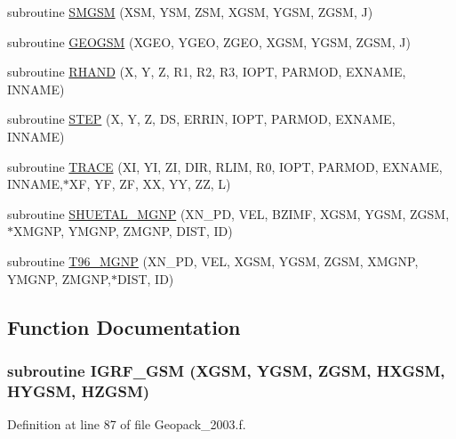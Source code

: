 \begin{CompactItemize}
\item 
subroutine \hyperlink{_geopack__2003_8f_3c1b6bd041138ad15b19a284572c0283}{SMGSM} (XSM, YSM, ZSM, XGSM, YGSM, ZGSM, J)
\item 
subroutine \hyperlink{_geopack__2003_8f_a724192dda005c0ef8d4e8cb9d5465dd}{GEOGSM} (XGEO, YGEO, ZGEO, XGSM, YGSM, ZGSM, J)
\item 
subroutine \hyperlink{_geopack__2003_8f_964ce3d6c1eb16a70ec41d33544e4d07}{RHAND} (X, Y, Z, R1, R2, R3, IOPT, PARMOD, EXNAME, INNAME)
\item 
subroutine \hyperlink{_geopack__2003_8f_4b84b9909d3de37b1cbfd0e8ef98d2af}{STEP} (X, Y, Z, DS, ERRIN, IOPT, PARMOD, EXNAME, INNAME)
\item 
subroutine \hyperlink{_geopack__2003_8f_e88b362d0d3c99ad9c733e9fc088b731}{TRACE} (XI, YI, ZI, DIR, RLIM, R0, IOPT, PARMOD, EXNAME, INNAME,$\ast$XF, YF, ZF, XX, YY, ZZ, L)
\item 
subroutine \hyperlink{_geopack__2003_8f_3bab20b0a7497f74438bdbad9bd01271}{SHUETAL\_\-MGNP} (XN\_\-PD, VEL, BZIMF, XGSM, YGSM, ZGSM,$\ast$XMGNP, YMGNP, ZMGNP, DIST, ID)
\item 
subroutine \hyperlink{_geopack__2003_8f_eb78a92a9deaca0077c026b5adf32cad}{T96\_\-MGNP} (XN\_\-PD, VEL, XGSM, YGSM, ZGSM, XMGNP, YMGNP, ZMGNP,$\ast$DIST, ID)
\end{CompactItemize}


\subsection{Function Documentation}
\hypertarget{_geopack__2003_8f_7ed9719f68132703108e5b59d36d7c03}{
\subsubsection[{IGRF\_\-GSM}]{\setlength{\rightskip}{0pt plus 5cm}subroutine IGRF\_\-GSM (XGSM, \/  YGSM, \/  ZGSM, \/  HXGSM, \/  HYGSM, \/  HZGSM)}}
\label{_geopack__2003_8f_7ed9719f68132703108e5b59d36d7c03}




Definition at line 87 of file Geopack\_\-2003.f.

